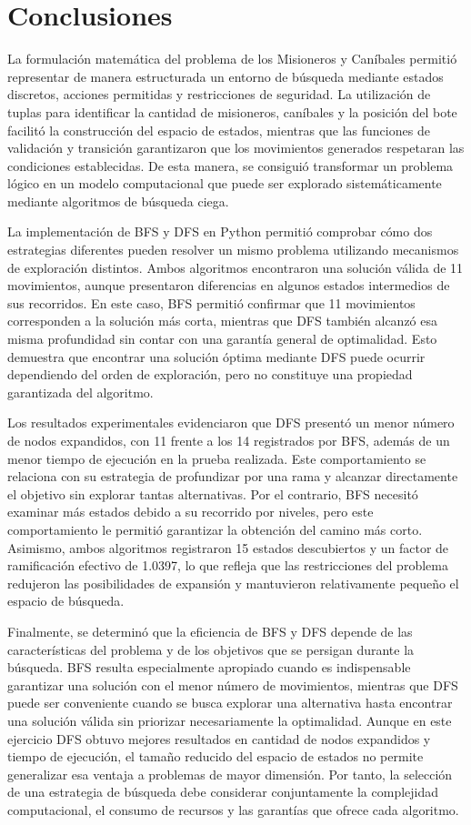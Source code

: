 \documentclass[
  spanish,
  11pt,
]{article}
\begin{document}
\section{Conclusiones}\label{conclusiones}

La formulación matemática del problema de los Misioneros y Caníbales
permitió representar de manera estructurada un entorno de búsqueda
mediante estados discretos, acciones permitidas y restricciones de
seguridad. La utilización de tuplas para identificar la cantidad de
misioneros, caníbales y la posición del bote facilitó la construcción
del espacio de estados, mientras que las funciones de validación y
transición garantizaron que los movimientos generados respetaran las
condiciones establecidas. De esta manera, se consiguió transformar un
problema lógico en un modelo computacional que puede ser explorado
sistemáticamente mediante algoritmos de búsqueda ciega.

La implementación de BFS y DFS en Python permitió comprobar cómo dos
estrategias diferentes pueden resolver un mismo problema utilizando
mecanismos de exploración distintos. Ambos algoritmos encontraron una
solución válida de 11 movimientos, aunque presentaron diferencias en
algunos estados intermedios de sus recorridos. En este caso, BFS
permitió confirmar que 11 movimientos corresponden a la solución más
corta, mientras que DFS también alcanzó esa misma profundidad sin contar
con una garantía general de optimalidad. Esto demuestra que encontrar
una solución óptima mediante DFS puede ocurrir dependiendo del orden de
exploración, pero no constituye una propiedad garantizada del algoritmo.

Los resultados experimentales evidenciaron que DFS presentó un menor
número de nodos expandidos, con 11 frente a los 14 registrados por BFS,
además de un menor tiempo de ejecución en la prueba realizada. Este
comportamiento se relaciona con su estrategia de profundizar por una
rama y alcanzar directamente el objetivo sin explorar tantas
alternativas. Por el contrario, BFS necesitó examinar más estados debido
a su recorrido por niveles, pero este comportamiento le permitió
garantizar la obtención del camino más corto. Asimismo, ambos algoritmos
registraron 15 estados descubiertos y un factor de ramificación efectivo
de 1.0397, lo que refleja que las restricciones del problema redujeron
las posibilidades de expansión y mantuvieron relativamente pequeño el
espacio de búsqueda.

Finalmente, se determinó que la eficiencia de BFS y DFS depende de las
características del problema y de los objetivos que se persigan durante
la búsqueda. BFS resulta especialmente apropiado cuando es indispensable
garantizar una solución con el menor número de movimientos, mientras que
DFS puede ser conveniente cuando se busca explorar una alternativa hasta
encontrar una solución válida sin priorizar necesariamente la
optimalidad. Aunque en este ejercicio DFS obtuvo mejores resultados en
cantidad de nodos expandidos y tiempo de ejecución, el tamaño reducido
del espacio de estados no permite generalizar esa ventaja a problemas de
mayor dimensión. Por tanto, la selección de una estrategia de búsqueda
debe considerar conjuntamente la complejidad computacional, el consumo
de recursos y las garantías que ofrece cada algoritmo.
\end{document}
